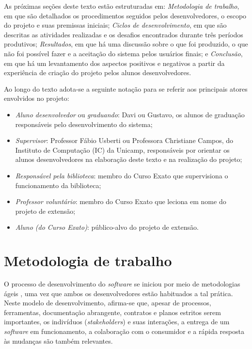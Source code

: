 \documentclass[a4paper]{article}
\begin{document}
As próximas seções deste texto estão estruturadas em: \textit{Metodologia de trabalho}, em que são detalhados os procedimentos seguidos pelos desenvolvedores, o escopo do projeto e suas premissas iniciais; \textit{Ciclos de desenvolvimento}, em que são descritas as atividades realizadas e os desafios encontrados durante três períodos produtivos; \textit{Resultados}, em que há uma discussão sobre o que foi produzido, o que não foi possível fazer e a aceitação do sistema pelos usuários finais; e \textit{Conclusão}, em que há um levantamento dos aspectos positivos e negativos a partir da experiência de criação do projeto pelos alunos desenvolvedores.

Ao longo do texto adota-se a seguinte notação para se referir aos principais atores envolvidos no projeto:
\begin{itemize}
\item \textit{Aluno desenvolvedor} ou \textit{graduando}: Davi ou Gustavo, os alunos de graduação responsáveis pelo desenvolvimento do sistema;
\item \textit{Supervisor}: Professor Fábio Usberti ou Professora Christiane Campos, do Instituto de Computação (IC) da Unicamp, responsáveis por orientar os alunos desenvolvedores na elaboração deste texto e na realização do projeto;
\item \textit{Responsável pela biblioteca}: membro do Curso Exato que supervisiona o funcionamento da biblioteca;
\item \textit{Professor voluntário}: membro do Curso Exato que leciona em nome do projeto de extensão;
\item \textit{Aluno (do Curso Exato)}: público-alvo do projeto de extensão.
\end{itemize}


\section{Metodologia de trabalho}
O processo de desenvolvimento do \textit{software} se iniciou por meio de metodologias ágeis \cite{manifesto}, uma vez que ambos os desenvolvedores estão habituados a tal prática. Neste modelo de desenvolvimento, afirma-se que, apesar de processos, ferramentas, documentação abrangente, contratos e planos estritos serem importantes, os indivíduos (\textit{stakeholders}) e suas interações, a entrega de um \textit{software} em funcionamento, a colaboração com o consumidor e a rápida resposta às mudanças são também relevantes.
\end{document}
